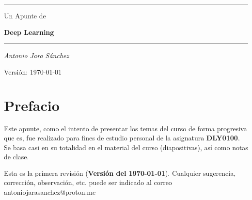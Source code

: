\documentclass[letterpaper,twoside]{article}
\makeatletter
\def\cleardoublepage{%
  \clearpage%
  \ifodd\c@page\else
    \hbox{}%
    \thispagestyle{empty}%
    \newpage%
  \fi}
\makeatother
\begin{document}
\thispagestyle{empty}

\begin{titlepage}
\begin{center}
\vspace*{\fill}

\rule{\textwidth}{1pt}
\vspace{1cm}

{\Large Un Apunte de}

\vspace{0.5cm}
{\Huge \textbf{Deep Learning}}

\vspace{1cm}
\rule{\textwidth}{0.8pt}

\vspace{2.5cm}

\Large \textit{Antonio Jara Sánchez}

\vspace{3cm}

\normalsize Versión: \today

\vspace*{\fill}
\end{center}
\end{titlepage}
\cleardoublepage

\pagestyle{plain}
\section*{Prefacio}

Este apunte, como el intento de presentar los temas del curso de forma progresiva que es, fue realizado para fines de estudio personal de la asignatura \textbf{DLY0100}. Se basa casi en su totalidad en el material del curso (diapositivas), así como notas de clase.

\medskip

Esta es la primera revisión (\textbf{Versión del \today}). Cualquier sugerencia, corrección, observación, etc. puede ser indicado al correo antoniojarasanchez@proton.me

\cleardoublepage

\tableofcontents

\cleardoublepage
{}
\setcounter{page}{1}
\pagestyle{fancy}


\end{document}

